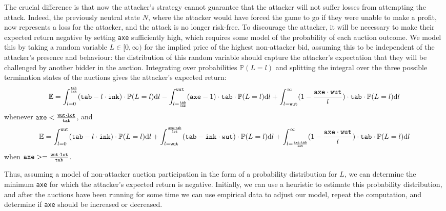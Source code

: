 \documentclass[a4paper,10pt]{article}
\begin{document}
\par The crucial difference is that now the attacker's strategy cannot guarantee that the attacker will not suffer losses from attempting the attack. Indeed, the previously neutral state $N$, where the attacker would have forced the game to go if they were unable to make a profit, now represents a loss for the attacker, and the attack is no longer risk-free. To discourage the attacker, it will be necessary to make their expected return negative by setting {\tt axe} sufficiently high, which requires some model of the probability of each auction outcome. We model this by taking a random variable $L \in [0, \infty ) $ for the implied price of the highest non-attacker bid, assuming this to be independent of the attacker's presence and behaviour: the distribution of this random variable should capture the attacker's expectation that they will be challenged by another bidder in the auction. Integrating over probabilities $\mathbb{P}(L = l)$ and splitting the integral over the three possible termination states of the auctions gives the attacker's expected return:
\begin{equation*}
  \mathbb{E} = \int_{l = 0}^{\frac{\tt tab}{\tt ink}} ({\tt tab} - l \cdot {\tt ink})\cdot \mathbb{P}(L = l) \mathrm{d}l - \int_{l = \frac{\tt tab}{\tt ink}}^{\tt wut} ({\tt axe} - 1)\cdot {\tt tab} \cdot \mathbb{P}(L = l) \mathrm{d}l + \int_{l = {\tt wut}}^{\infty} (1 - \frac{{\tt axe} \cdot {\tt wut}}{l})\cdot {\tt tab} \cdot \mathbb{P}(L = l) \mathrm{d}l
\end{equation*}
whenever ${\tt axe} < \frac{{\tt wut} \cdot {\tt lot}}{\tt tab}$, and
\begin{equation*}
\mathbb{E} = \int_{l = 0}^{\tt wut} ({\tt tab} - l \cdot {\tt ink})\cdot \mathbb{P}(L = l) \mathrm{d}l + \int_{l = {\tt wut}}^{\frac{{\tt axe}\cdot{\tt tab}}{\tt lot}} ({\tt tab} - {\tt ink}\cdot {\tt wut}) \cdot \mathbb{P}(L = l) \mathrm{d}l + \int_{l = \frac{{\tt axe}\cdot{\tt tab}}{\tt lot}}^{\infty} (1 - \frac{{\tt axe}\cdot{\tt wut}}{l})\cdot {\tt tab} \cdot \mathbb{P}(L = l) \mathrm{d}l
\end{equation*}
when ${\tt axe} >= \frac{{\tt wut} \cdot {\tt lot}}{\tt tab}$.
\par Thus, assuming a model of non-attacker auction participation in the form of a probability distribution for $L$, we can determine the minimum {\tt axe} for which the attacker's expected return is negative. Initially, we can use a heuristic to estimate this probability distribution, and after the auctions have been running for some time we can use empirical data to adjust our model, repeat the computation, and determine if {\tt axe} should be increased or decreased.
\end{document}
